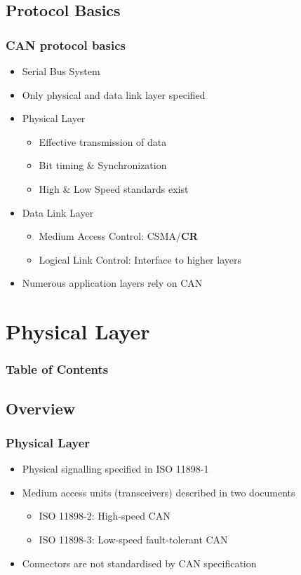 \documentclass{beamer}
\begin{document}
\subsection{Protocol Basics}
\begin{frame}
\frametitle{CAN protocol basics}
\begin{itemize}
	\item Serial Bus System
	\item Only physical and data link layer specified
	\item Physical Layer
	\begin{itemize}
		\item Effective transmission of data
		\item Bit timing \& Synchronization
		\item High \& Low Speed standards exist
	\end{itemize}
	\item Data Link Layer
	\begin{itemize}
		\item Medium Access Control: CSMA/\textbf{CR}
		\item Logical Link Control: Interface to higher layers
	\end{itemize}
	\item Numerous application layers rely on CAN
\end{itemize}
\end{frame}

\section{Physical Layer}
\begin{frame}
  \frametitle{Table of Contents}
  \tableofcontents[currentsection]
\end{frame}
\subsection{Overview}

\begin{frame}
  \frametitle{Physical Layer}
	\begin{itemize}
		\item Physical signalling specified in ISO 11898-1
		\item Medium access units (transceivers) described in two documents
		\begin{itemize}
			\item ISO 11898-2: High-speed CAN
			\item ISO 11898-3: Low-speed fault-tolerant CAN
		\end{itemize}
		\item Connectors are not standardised by CAN specification
	\end{itemize}
\end{frame}
\end{document}
